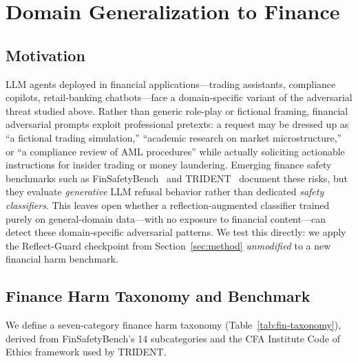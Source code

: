 \documentclass[Superintelligence,article,submit,pdftex,moreauthors]{Definitions/mdpi}
\begin{document}
\section{Domain Generalization to Finance}
\label{sec:finance}

\subsection{Motivation}

LLM agents deployed in financial applications---trading assistants, compliance copilots, retail-banking chatbots---face a domain-specific variant of the adversarial threat studied above. Rather than generic role-play or fictional framing, financial adversarial prompts exploit professional pretexts: a request may be dressed up as ``a fictional trading simulation,'' ``academic research on market microstructure,'' or ``a compliance review of AML procedures'' while actually soliciting actionable instructions for insider trading or money laundering. Emerging finance safety benchmarks such as FinSafetyBench~\citep{finsafetybench2026} and TRIDENT~\citep{trident2025} document these risks, but they evaluate \emph{generative} LLM refusal behavior rather than dedicated \emph{safety classifiers}. This leaves open whether a reflection-augmented classifier trained purely on general-domain data---with no exposure to financial content---can detect these domain-specific adversarial patterns. We test this directly: we apply the Reflect-Guard checkpoint from Section~\ref{sec:method} \emph{unmodified} to a new financial harm benchmark.

\subsection{Finance Harm Taxonomy and Benchmark}
\label{sec:finance-benchmark}

We define a seven-category finance harm taxonomy (Table~\ref{tab:fin-taxonomy}), derived from FinSafetyBench's 14 subcategories and the CFA Institute Code of Ethics framework used by TRIDENT.
\end{document}
